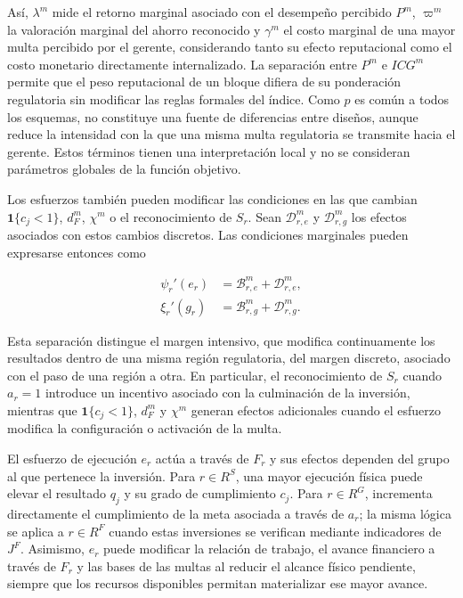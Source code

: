 Así, \(\lambda^m\) mide el retorno marginal asociado con el desempeño percibido \(P^m\), \(\varpi^m\) la valoración marginal del ahorro reconocido y \(\gamma^m\) el costo marginal de una mayor multa percibido por el gerente, considerando tanto su efecto reputacional como el costo monetario directamente internalizado. La separación entre \(P^m\) e \(ICG^m\) permite que el peso reputacional de un bloque difiera de su ponderación regulatoria sin modificar las reglas formales del índice. Como \(p\) es común a todos los esquemas, no constituye una fuente de diferencias entre diseños, aunque reduce la intensidad con la que una misma multa regulatoria se transmite hacia el gerente. Estos términos tienen una interpretación local y no se consideran parámetros globales de la función objetivo.

Los esfuerzos también pueden modificar las condiciones en las que cambian \(\mathbf 1\{c_j<1\}\), \(d_F^m\), \(\chi^m\) o el reconocimiento de \(S_r\). Sean \(\mathcal D_{r,e}^m\) y \(\mathcal D_{r,g}^m\) los efectos asociados con estos cambios discretos. Las condiciones marginales pueden expresarse entonces como

\begin{subequations}
\label{eq:foc_completas}
\begin{align}
\psi_r'(e_r)
&=
\mathcal B_{r,e}^{m}
+
\mathcal D_{r,e}^{m},
\label{eq:foc_e_completa}
\\
\xi_r'(g_r)
&=
\mathcal B_{r,g}^{m}
+
\mathcal D_{r,g}^{m}.
\label{eq:foc_g_completa}
\end{align}
\end{subequations}

Esta separación distingue el margen intensivo, que modifica continuamente los resultados dentro de una misma región regulatoria, del margen discreto, asociado con el paso de una región a otra. En particular, el reconocimiento de \(S_r\) cuando \(a_r=1\) introduce un incentivo asociado con la culminación de la inversión, mientras que \(\mathbf 1\{c_j<1\}\), \(d_F^m\) y \(\chi^m\) generan efectos adicionales cuando el esfuerzo modifica la configuración o activación de la multa.

El esfuerzo de ejecución \(e_r\) actúa a través de \(F_r\) y sus efectos dependen del grupo al que pertenece la inversión. Para \(r\in R^{S}\), una mayor ejecución física puede elevar el resultado \(q_j\) y su grado de cumplimiento \(c_j\). Para \(r\in R^{G}\), incrementa directamente el cumplimiento de la meta asociada a través de \(a_r\); la misma lógica se aplica a \(r\in R^{F}\) cuando estas inversiones se verifican mediante indicadores de \(J^{F}\). Asimismo, \(e_r\) puede modificar la relación de trabajo, el avance financiero a través de \(F_r\) y las bases de las multas al reducir el alcance físico pendiente, siempre que los recursos disponibles permitan materializar ese mayor avance.

